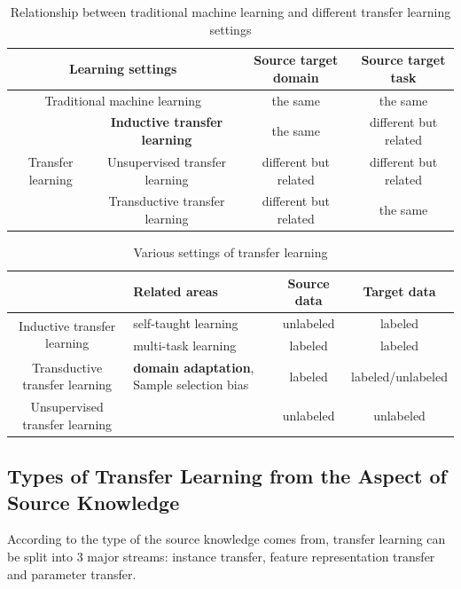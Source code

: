 \begin{table}[htbp]
	\centering
	\caption{Relationship between traditional machine learning and different transfer learning settings}
	\begin{tabular}{|c|c|c|c|}
		\hline
		\multicolumn{2}{|c|}{Learning settings} & Source target domain & Source target task \\
		\hline
		\multicolumn{2}{|c|}{Traditional machine learning} & the same & the same \\\hline
		\multirow{3}{*}{Transfer learning} & \textbf{Inductive transfer learning} & the same & different but related \\\cline{2-4}
		& Unsupervised transfer learning & different but related & different but related \\\cline{2-4}
		& Transductive transfer learning & different but related & the same \\\hline    
	\end{tabular}%
	\label{tab:related:transfercmp}%
\end{table}%

\begin{table}[htbp]
	\centering
	\caption{Various settings of transfer learning}
	\begin{tabular}{|c|C{4cm}|c|c|}
		\hline
		& Related areas & Source data & Target data \\
		\hline
		[4]{*}{Inductive transfer learning} & self-taught learning & unlabeled & labeled \\
		& multi-task learning & labeled & labeled \\\hline
		Transductive transfer learning& \textbf{domain adaptation}, Sample selection bias & labeled & labeled/unlabeled \\\hline
		Unsupervised transfer learning &       & unlabeled & unlabeled \\
		\hline
	\end{tabular}%
	\label{tab:related:transfersetting}%
\end{table}%

\subsection{Types of Transfer Learning from the Aspect of Source Knowledge}
According to the type of the source knowledge comes from, transfer learning can be split into 3 major streams: instance transfer, feature representation transfer and parameter transfer.

